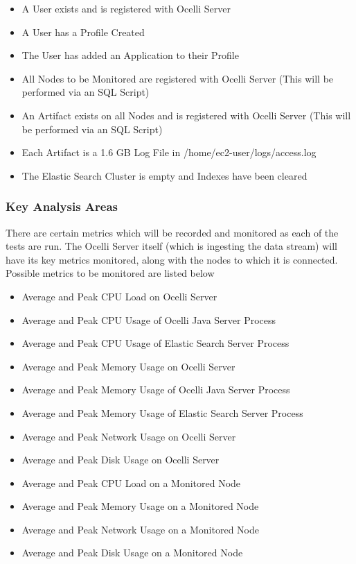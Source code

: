 \documentclass{llncs}
\begin{document}
\begin{itemize}
\item A User exists and is registered with Ocelli Server 
\item A User has a Profile Created
\item The User has added an Application to their Profile
\item All Nodes to be Monitored are registered with Ocelli Server (This will be performed via an SQL Script)
\item An Artifact exists on all Nodes and is registered with Ocelli Server (This will be performed via an SQL Script)
\item Each Artifact is a 1.6 GB Log File in /home/ec2-user/logs/access.log
\item The Elastic Search Cluster is empty and Indexes have been cleared
 \end{itemize}

\subsubsection{Key Analysis Areas}

There are certain metrics which will be recorded and monitored as each of the tests are run. The Ocelli Server itself (which is ingesting the data stream) will have its key metrics monitored, along with the nodes to which it is connected. Possible metrics to be monitored are listed below

\begin{itemize}
\item Average and Peak CPU Load on Ocelli Server
\item Average and Peak CPU Usage of Ocelli Java Server Process
\item Average and Peak CPU Usage of Elastic Search Server Process
\item Average and Peak Memory Usage on Ocelli Server
\item Average and Peak Memory Usage of Ocelli Java Server Process
\item Average and Peak Memory Usage of Elastic Search Server Process
\item Average and Peak Network Usage on Ocelli Server
\item Average and Peak Disk Usage on Ocelli Server
\item Average and Peak CPU Load on a Monitored Node
\item Average and Peak Memory Usage on a Monitored Node
\item Average and Peak Network Usage on a Monitored Node
\item Average and Peak Disk Usage on a Monitored Node
\end{itemize}
\end{document}
